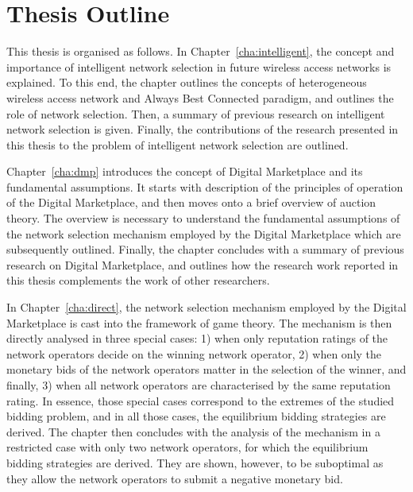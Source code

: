 \section{Thesis Outline} %
\label{sec:thesis_outline_introduction}
This thesis is organised as follows. In Chapter~\ref{cha:intelligent}, the concept and importance of intelligent network selection in future wireless access networks is explained. To this end, the chapter outlines the concepts of heterogeneous wireless access network and Always Best Connected paradigm, and outlines the role of network selection. Then, a summary of previous research on intelligent network selection is given. Finally, the contributions of the research presented in this thesis to the problem of intelligent network selection are outlined.

Chapter~\ref{cha:dmp} introduces the concept of Digital Marketplace and its fundamental assumptions. It starts with description of the principles of operation of the Digital Marketplace, and then moves onto a brief overview of auction theory. The overview is necessary to understand the fundamental assumptions of the network selection mechanism employed by the Digital Marketplace which are subsequently outlined. Finally, the chapter concludes with a summary of previous research on Digital Marketplace, and outlines how the research work reported in this thesis complements the work of other researchers.

In Chapter~\ref{cha:direct}, the network selection mechanism employed by the Digital Marketplace is cast into the framework of game theory. The mechanism is then directly analysed in three special cases: 1) when only reputation ratings of the network operators decide on the winning network operator, 2) when only the monetary bids of the network operators matter in the selection of the winner, and finally, 3) when all network operators are characterised by the same reputation rating. In essence, those special cases correspond to the extremes of the studied bidding problem, and in all those cases, the equilibrium bidding strategies are derived. The chapter then concludes with the analysis of the mechanism in a restricted case with only two network operators, for which the equilibrium bidding strategies are derived. They are shown, however, to be suboptimal as they allow the network operators to submit a negative monetary bid.

